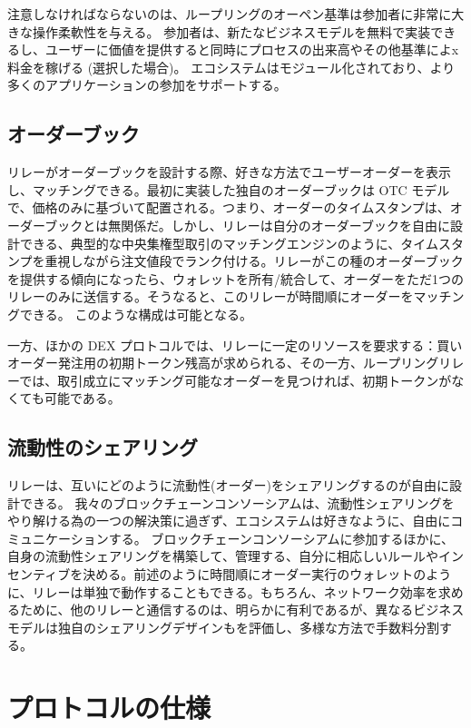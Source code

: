\documentclass{article}
\begin{document}
\begin{multicols}{2}
注意しなければならないのは、ループリングのオーペン基準は参加者に非常に大きな操作柔軟性を与える。 参加者は、新たなビジネスモデルを無料で実装できるし、ユーザーに価値を提供すると同時にプロセスの出来高やその他基準によx料金を稼げる (選択した場合)。 エコシステムはモジュール化されており、より多くのアプリケーションの参加をサポートする。

\subsection{オーダーブック\label{sec:order_book}}
リレーがオーダーブックを設計する際、好きな方法でユーザーオーダーを表示し、マッチングできる。最初に実装した独自のオーダーブックは OTC モデルで、価格のみに基づいて配置される。つまり、オーダーのタイムスタンプは、オーダーブックとは無関係だ。しかし、リレーは自分のオーダーブックを自由に設計できる、典型的な中央集権型取引のマッチングエンジンのように、タイムスタンプを重視しながら注文値段でランク付ける。リレーがこの種のオーダーブックを提供する傾向になったら、ウォレットを所有/統合して、オーダーをただ1つのリレーのみに送信する。そうなると、このリレーが時間順にオーダーをマッチングできる。 このような構成は可能となる。

一方、ほかの DEX プロトコルでは、リレーに一定のリソースを要求する：買いオーダー発注用の初期トークン残高が求められる、その一方、ループリングリレーでは、取引成立にマッチング可能なオーダーを見つければ、初期トークンがなくても可能である。

\subsection{流動性のシェアリング\label{sec:liquidity_sharing}}
リレーは、互いにどのように流動性(オーダー)をシェアリングするのが自由に設計できる。 我々のブロックチェーンコンソーシアムは、流動性シェアリングをやり解ける為の一つの解決策に過ぎず、エコシステムは好きなように、自由にコミュニケーションする。 ブロックチェーンコンソーシアムに参加するほかに、自身の流動性シェアリングを構築して、管理する、自分に相応しいルールやインセンティブを決める。前述のように時間順にオーダー実行のウォレットのように、リレーは単独で動作することもできる。もちろん、ネットワーク効率を求めるために、他のリレーと通信するのは、明らかに有利であるが、異なるビジネスモデルは独自のシェアリングデザインもを評価し、多様な方法で手数料分割する。

\section{プロトコルの仕様\label{sec:protocol}}


\end{multicols}
\end{document}
